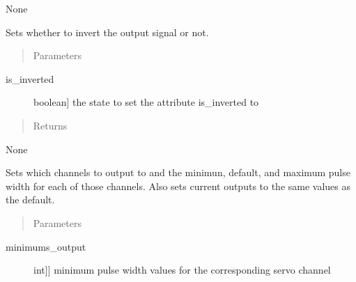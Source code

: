 \documentclass[letterpaper,10pt,english]{sphinxmanual}
\begin{document}
\begin{fulllineitems}
\begin{fulllineitems}
\sphinxAtStartPar
None

\end{fulllineitems}


\begin{fulllineitems}
\label{\detokenize{specific:NeckTiltOutput.NeckTiltOutput.set_inversion}}
\sphinxAtStartPar
Sets whether to invert the output signal or not.
\begin{quote}\begin{description}
\item[{Parameters}] \leavevmode
\end{description}\end{quote}
\begin{description}
\item[{is\_inverted}] \leavevmode{[}boolean{]}
\sphinxAtStartPar
the state to set the attribute is\_inverted to

\end{description}
\begin{quote}\begin{description}
\item[{Returns}] \leavevmode
\end{description}\end{quote}

\sphinxAtStartPar
None

\end{fulllineitems}


\begin{fulllineitems}
\label{\detokenize{specific:NeckTiltOutput.NeckTiltOutput.set_outputs}}
\sphinxAtStartPar
Sets which channels to output to and the minimun, default, and maximum pulse width for each of those channels.
Also sets current outputs to the same values as the default.
\begin{quote}\begin{description}
\item[{Parameters}] \leavevmode
\end{description}\end{quote}
\begin{description}
\item[{minimums\_output}] \leavevmode{[}{[}int{]}{]}
\sphinxAtStartPar
minimum pulse width values for the corresponding servo channel


\end{description}
\end{fulllineitems}
\end{fulllineitems}
\end{document}
